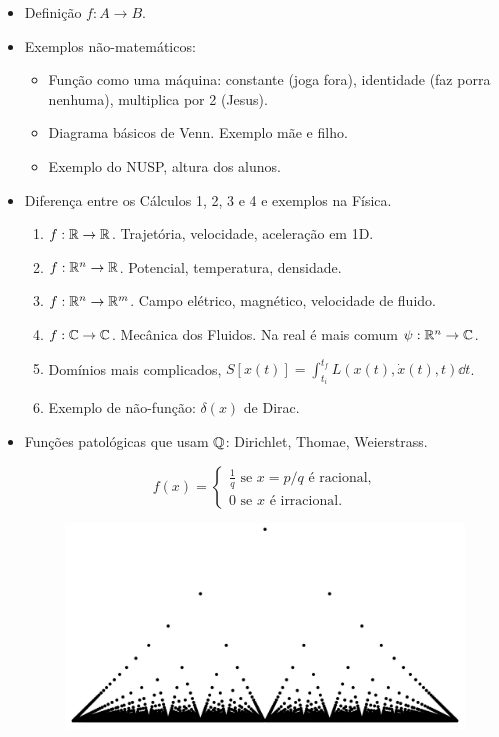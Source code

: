 \documentclass[a4paper,fleqn,12pt]{article}
\begin{document}
\begin{itemize}
\item Definição $f: A \to B$.
\item Exemplos não-matemáticos:
\begin{itemize}
\item Função como uma máquina: constante (joga fora), identidade (faz porra nenhuma), multiplica por 2 (Jesus).
\item Diagrama básicos de Venn. Exemplo mãe e filho.
\item Exemplo do NUSP, altura dos alunos.
\end{itemize}

\item Diferença entre os Cálculos 1, 2, 3 e 4 e exemplos na Física.
\begin{enumerate}
\item $f: \mathbb{R} \to \mathbb{R}$. Trajetória, velocidade, aceleração em 1D.
\item $f: \mathbb{R}^n \to \mathbb{R}$. Potencial, temperatura, densidade.
\item $f: \mathbb{R}^n \to \mathbb{R}^m$. Campo elétrico, magnético, velocidade de fluido.
\item $f: \mathbb{C} \to \mathbb{C}$. Mecânica dos Fluidos. Na real é mais comum $\psi: \mathbb{R}^n \to \mathbb{C}$.
\item Domínios mais complicados, $S[x(t)] = \int_{t_i}^{t_f} L(x(t), \dot{x}(t), t) \dd{t}$.
\item Exemplo de não-função: $\delta(x)$ de Dirac.
\end{enumerate}

\item Funções patológicas que usam $\mathbb{Q}$: Dirichlet, Thomae, Weierstrass.

\begin{minipage}{0.4\textwidth}
$$
f(x) =
\begin{cases}
\frac{1}{q} \text{ se } x = p/q \text{ é racional,} \\
0 \text{ se } x \text{ é irracional.}
\end{cases}
$$
\end{minipage}
\begin{minipage}{0.4\textwidth}
\begin{figure}[H]
  \centering
  \includegraphics[width=1.\linewidth]{fig/thomae.png}
  \label{fig:thomae}
\end{figure}
\end{minipage}


\end{itemize}
\end{document}
